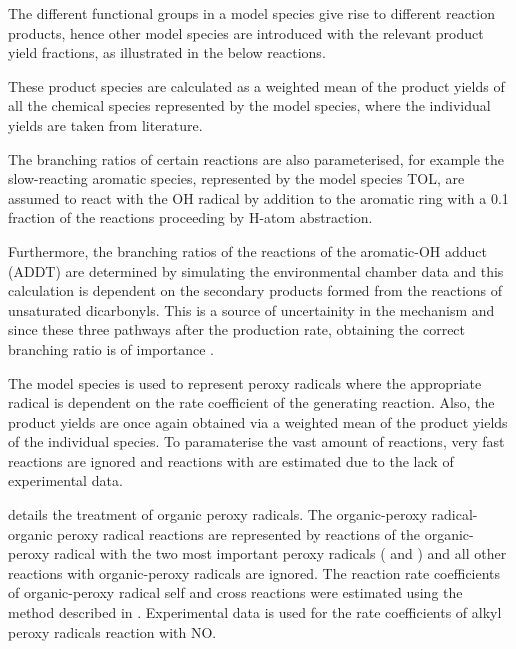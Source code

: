 The different functional groups in a model species give rise to different reaction products, hence other model species are 
introduced with the relevant product yield fractions, as illustrated in the below reactions.
\begin{reactionlist}
\end{reactionlist}
These product species are calculated as a weighted mean of the product yields of all the chemical species represented by the 
model species, where the individual yields are taken from literature. 

The branching ratios of certain reactions are also parameterised, for example the slow-reacting aromatic species, represented by
the model species TOL, are assumed to react with the OH radical by addition to the aromatic ring with a 0.1 fraction of the 
reactions proceeding by H-atom abstraction.
\begin{reactionlist}
\end{reactionlist}
Furthermore, the branching ratios of the reactions of the aromatic-OH adduct (ADDT) are determined by simulating the 
environmental chamber data and this calculation is dependent on the secondary products formed from the reactions of unsaturated 
dicarbonyls. This is a source of uncertainity in the mechanism and since these three pathways after the  production rate,
obtaining the correct branching ratio is of importance \citep{Stockwell:1997}.

The model species  is used to represent peroxy radicals where the appropriate  radical is dependent on the rate 
coefficient of the generating reaction. Also, the product yields are once again obtained via a weighted mean of the product 
yields of the individual species. To paramaterise the vast amount of reactions, very fast reactions are ignored and reactions 
with  are estimated due to the lack of experimental data. 

\citep{Kirchner:1996} details the treatment of organic peroxy radicals. The organic-peroxy radical-organic peroxy radical 
reactions are represented by reactions of the organic-peroxy radical with the two most important peroxy radicals ( and
) and all other reactions with organic-peroxy radicals are ignored. The reaction rate coefficients of 
organic-peroxy radical self and cross reactions were estimated using the method described in \citep{Kirchner:1996}. Experimental 
data is used for the rate coefficients of alkyl peroxy radicals reaction with NO. 


